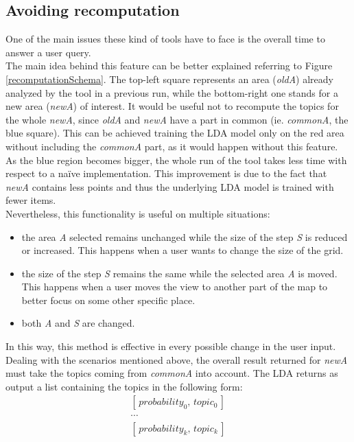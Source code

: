\documentclass{sig-alternate-05-2015}
\begin{document}
\subsection{Avoiding recomputation}\label{avoidingRecomputation}
One of the main issues these kind of tools have to face is the overall time to answer a user query.\\
The main idea behind this feature can be better explained referring to Figure \ref{recomputationSchema}. The top-left square represents an area (\emph{oldA}) already analyzed by the tool in a previous run, while the bottom-right one stands for a new area (\emph{newA}) of interest. It would be useful not to recompute the topics for the whole \emph{newA}, since \emph{oldA} and \emph{newA} have a part in common (ie. \emph{commonA}, the blue square). This can be achieved training the LDA model only on the red area without including the \emph{commonA} part, as it would happen without this feature. As the blue region becomes bigger, the whole run of the tool takes less time with respect to a na\"{i}ve implementation. This improvement is due to the fact that \emph{newA} contains less points and thus the underlying LDA model is trained with fewer items.\\
Nevertheless, this functionality is useful on multiple situations:
\begin{itemize}
    \item the area \emph{A} selected remains unchanged while the size of the step \emph{S} is reduced or increased. This happens when a user wants to change the size of the grid.
    \item the size of the step \emph{S} remains the same while the selected area \emph{A} is moved. This happens when a user moves the view to another part of the map to better focus on some other specific place.
    \item both \emph{A} and \emph{S} are changed. 
\end{itemize}
In this way, this method is effective in every possible change in the user input.\\
Dealing with the scenarios mentioned above, the overall result returned for \emph{newA} must take the topics coming from \emph{commonA} into account. The LDA returns as output a list containing the topics in the following form:
\begin{equation}
    \begin{split}
        [\,probability_0,\,topic_0\,] \\
        \cdots \\
        [\,probability_k,\,topic_k\,]
    \end{split}
\end{equation}
\end{document}

